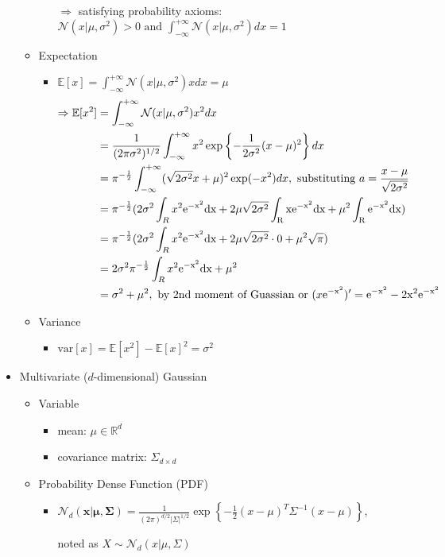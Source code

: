 \begin{itemize}
\begin{itemize}
\begin{itemize}
		$\Rightarrow$ satisfying probability axioms: $\displaystyle \mathcal N(x|\mu,\sigma^2)>0 \text{ and } \int_{-\infty}^{+\infty} \mathcal N (x|\mu,\sigma^2) dx = 1$
		\end{itemize}
	\item Expectation
		\begin{itemize}
		\item $\displaystyle \mathbb{E}[x] = \int_{-\infty}^{+\infty}\mathcal{N}(x|\mu, \sigma^2)xdx=\mu$
		\begin{align*}
		\Rightarrow \displaystyle \mathbb E [x^2] &= \int_{-\infty}^{+\infty} \mathcal{N}(x|\mu, \sigma^2)x^2dx \\ 
		&= \frac 1 {(2\pi \sigma^2)^{1/2}} \int_{-\infty}^{+\infty} x^2 \exp \left\{ -\frac 1 {2\sigma^2}(x-\mu)^2 \right\} dx \\ 
		&= \pi^{-\frac 12} \int_{-\infty}^{+\infty} (\sqrt{2\sigma^2}x+\mu)^2 \exp(-x^2) dx, \text{ substituting } a=\frac{x-\mu}{\sqrt{2\sigma^2}} \\ 
		&= \pi^{-\frac 12} (2\sigma^2\int_R x^2\rm{e}^{-x^2}dx + 2\mu\sqrt{2\sigma^2}\int_R x\rm{e}^{-x^2}dx + \mu^2 \int_R \rm{e}^{-x^2}dx ) \\ 
		&= \pi^{-\frac 12} ( 2\sigma^2\int_R x^2\rm{e}^{-x^2}dx + 2\mu\sqrt{2\sigma^2}\cdot 0 + \mu^2\sqrt\pi ) \\ 
		&= 2\sigma^2\pi^{-\frac 12}\int_R x^2\rm{e}^{-x^2}dx + \mu^2 \\ 
		&= \sigma^2 + \mu^2, \text{ by 2nd moment of Guassian or } (x\rm e^{-x^2})' = e^{-x^2}-2x^2\rm e^{-x^2}
		\end{align*}
		\end{itemize}
	\item Variance
		\begin{itemize}
		\item $\displaystyle \text{var}[x] = \mathbb E[x^2] - \mathbb E[x]^2 = \sigma^2$
		\end{itemize}
	\end{itemize}
\item Multivariate ($d$-dimensional) Gaussian
	\begin{itemize}
	\item Variable
		\begin{itemize}
		\item mean: $\mu \in \mathbb R^d$
		\item covariance matrix: $\Sigma_{d\times d}$
		\end{itemize}
	\item Probability Dense Function (PDF)
		\begin{itemize}
		\item $\displaystyle \mathcal N_d(\mathbf x|\mathbf{\mu},\mathbf \Sigma) = \frac 1 {(2\pi)^{d/2} |\Sigma|^{1/2}} \exp \left\{ -\frac 1 2 (x-\mu)^T \Sigma^{-1} (x-\mu) \right\} $,
		
		noted as $X\sim \mathcal N_d (x|\mu,\Sigma)$
		\end{itemize}
	\end{itemize}
\end{itemize}

